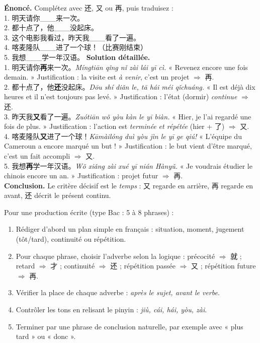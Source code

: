 \documentclass[11pt]{article}
\newcommand{\zh}[1]{\ifmmode\text{#1}\else{#1}\fi}
\begin{document}
\begin{exoresolu}
\textbf{Énoncé.} Complétez avec 还, 又 ou 再, puis traduisez :\\
1. 明天请你\_\_\_来一次。\\
2. 都十点了，他\_\_\_没起床。\\
3. 这个电影我看过，昨天我\_\_\_看了一遍。\\
4. 喀麦隆队\_\_\_进了一个球！（比赛刚结束）\\
5. 我想\_\_\_学一年汉语。
\tcblower
\textbf{Solution détaillée.}\\
1. 明天请你\textbf{再}来一次。\emph{Míngtiān qǐng nǐ zài lái yī cì.} « Revenez encore une fois demain. » Justification : la visite est \emph{à venir}, c'est un projet $\Rightarrow$ 再.\\
2. 都十点了，他\textbf{还}没起床。\emph{Dōu shí diǎn le, tā hái méi qǐchuáng.} « Il est déjà dix heures et il n'est toujours pas levé. » Justification : l'état (dormir) \emph{continue} $\Rightarrow$ 还.\\
3. 昨天我\textbf{又}看了一遍。\emph{Zuótiān wǒ yòu kàn le yī biàn.} « Hier, je l'ai regardé une fois de plus. » Justification : l'action est \emph{terminée et répétée} (hier + 了) $\Rightarrow$ 又.\\
4. 喀麦隆队\textbf{又}进了一个球！\emph{Kāmàilóng duì yòu jìn le yī ge qiú!} « L'équipe du Cameroun a encore marqué un but ! » Justification : le but vient d'être marqué, c'est un fait accompli $\Rightarrow$ 又.\\
5. 我想\textbf{再}学一年汉语。\emph{Wǒ xiǎng zài xué yī nián Hànyǔ.} « Je voudrais étudier le chinois encore un an. » Justification : projet futur $\Rightarrow$ 再.\\
\textbf{Conclusion.} Le critère décisif est le \emph{temps} : 又 regarde en arrière, 再 regarde en avant, 还 décrit le présent continu.
\end{exoresolu}

\begin{methode}
Pour une production écrite (type Bac : 5 à 8 phrases) :
\begin{enumerate}
\item Rédiger d'abord un plan simple en français : situation, moment, jugement (tôt/tard), continuité ou répétition.
\item Pour chaque phrase, choisir l'adverbe selon la logique : précocité $\Rightarrow$ 就 ; retard $\Rightarrow$ 才 ; continuité $\Rightarrow$ 还 ; répétition passée $\Rightarrow$ 又 ; répétition future $\Rightarrow$ 再.
\item Vérifier la place de chaque adverbe : \emph{après le sujet, avant le verbe}.
\item Contrôler les tons en relisant le pinyin : \emph{jiù, cái, hái, yòu, zài}.
\item Terminer par une phrase de conclusion naturelle, par exemple avec \zh{以后} « plus tard » ou \zh{所以} « donc ».
\end{enumerate}
\end{methode}
\end{document}
